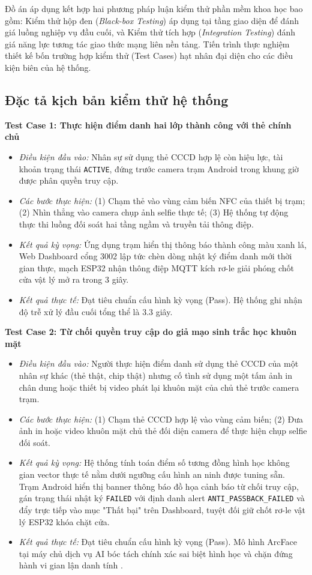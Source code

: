 ﻿\documentclass[../DoAn.tex]{subfiles}
\begin{document}
Đồ án áp dụng kết hợp hai phương pháp luận kiểm thử phần mềm khoa học bao gồm: Kiểm thử hộp đen (\textit{Black-box Testing}) áp dụng tại tầng giao diện để đánh giá luồng nghiệp vụ đầu cuối, và Kiểm thử tích hợp (\textit{Integration Testing}) đánh giá năng lực tương tác giao thức mạng liên nền tảng. Tiến trình thực nghiệm thiết kế bốn trường hợp kiểm thử (Test Cases) hạt nhân đại diện cho các điều kiện biên của hệ thống.

\subsection{Đặc tả kịch bản kiểm thử hệ thống}

\textbf{Test Case 1: Thực hiện điểm danh hai lớp thành công với thẻ chính chủ}
\begin{itemize}
    \item \textit{Điều kiện đầu vào:} Nhân sự sử dụng thẻ CCCD hợp lệ còn hiệu lực, tài khoản trạng thái \texttt{ACTIVE}, đứng trước camera trạm Android trong khung giờ được phân quyền truy cập.
    \item \textit{Các bước thực hiện:} (1) Chạm thẻ vào vùng cảm biến NFC của thiết bị trạm; (2) Nhìn thẳng vào camera chụp ảnh selfie thực tế; (3) Hệ thống tự động thực thi luồng đối soát hai tầng ngầm và truyền tải thông điệp.
    \item \textit{Kết quả kỳ vọng:} Ứng dụng trạm hiển thị thông báo thành công màu xanh lá, Web Dashboard cổng 3002 lập tức chèn dòng nhật ký điểm danh mới thời gian thực, mạch ESP32 nhận thông điệp MQTT kích rơ-le giải phóng chốt cửa vật lý mở ra trong 3 giây.
    \item \textit{Kết quả thực tế:} Đạt tiêu chuẩn cấu hình kỳ vọng (Pass). Hệ thống ghi nhận độ trễ xử lý đầu cuối tổng thể là 3.3 giây.
\end{itemize}

\textbf{Test Case 2: Từ chối quyền truy cập do giả mạo sinh trắc học khuôn mặt}
\begin{itemize}
    \item \textit{Điều kiện đầu vào:} Người thực hiện điểm danh sử dụng thẻ CCCD của một nhân sự khác (thẻ thật, chip thật) nhưng cố tình sử dụng một tấm ảnh in chân dung hoặc thiết bị video phát lại khuôn mặt của chủ thẻ trước camera trạm.
    \item \textit{Các bước thực hiện:} (1) Chạm thẻ CCCD hợp lệ vào vùng cảm biến; (2) Đưa ảnh in hoặc video khuôn mặt chủ thẻ đối diện camera để thực hiện chụp selfie đối soát.
    \item \textit{Kết quả kỳ vọng:} Hệ thống tính toán điểm số tương đồng hình học không gian vector thực tế nằm dưới ngưỡng cấu hình an ninh được tuning sẵn. Trạm Android hiển thị banner thông báo đồ họa cảnh báo từ chối truy cập, gán trạng thái nhật ký \texttt{FAILED} với định danh alert \texttt{ANTI\_PASSBACK\_FAILED} và đẩy trực tiếp vào mục "Thất bại" trên Dashboard, tuyệt đối giữ chốt rơ-le vật lý ESP32 khóa chặt cửa.
    \item \textit{Kết quả thực tế:} Đạt tiêu chuẩn cấu hình kỳ vọng (Pass). Mô hình ArcFace tại máy chủ dịch vụ AI bóc tách chính xác sai biệt hình học và chặn đứng hành vi gian lận danh tính \cite{insightface2021}.
\end{itemize}
\end{document}
